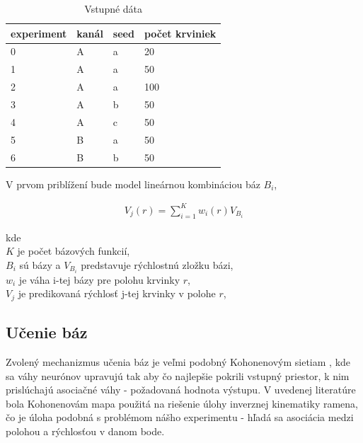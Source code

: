 \documentclass[10pt,a4paper]{article}
\begin{document}
\begin{table}[ht]
\centering
\caption{Vstupné dáta}
\label{tab:experiments}
\begin{tabular}{|l|l|l|l|}
\hline
experiment & kanál                    & {\color[HTML]{000000} seed} & {\color[HTML]{000000} počet krviniek} \\ \hline
0          & {\color[HTML]{FE0000} A} & {\color[HTML]{000000} a}    & {\color[HTML]{000000} 20}             \\ \hline
1          & {\color[HTML]{FE0000} A} & {\color[HTML]{000000} a}    & {\color[HTML]{000000} 50}             \\ \hline
2          & {\color[HTML]{FE0000} A} & {\color[HTML]{000000} a}    & {\color[HTML]{000000} 100}            \\ \hline
3          & {\color[HTML]{FE0000} A} & {\color[HTML]{000000} b}    & {\color[HTML]{000000} 50}             \\ \hline
4          & {\color[HTML]{FE0000} A} & {\color[HTML]{000000} c}    & {\color[HTML]{000000} 50}             \\ \hline
5          & {\color[HTML]{3531FF} B} & {\color[HTML]{000000} a}    & {\color[HTML]{000000} 50}             \\ \hline
6          & {\color[HTML]{3531FF} B} & {\color[HTML]{000000} b}    & {\color[HTML]{000000} 50}             \\ \hline
\end{tabular}
\end{table}

V prvom priblížení bude model lineárnou kombináciou báz $B_i$,

\begin{align}
 V_j(r) = \sum_{i=1}^{K} w_i(r)V_{B_i}
 \label{eq:lin_model}
\end{align}

kde \\
$K$ je počet bázových funkcií, \\
$B_i$ sú bázy a $V_{B_i}$ predstavuje rýchlostnú zložku bázi, \\
$w_i$ je váha i-tej bázy pre polohu krvinky $r$, \\
$V_j$ je predikovaná rýchlosť j-tej krvinky v polohe $r$, \\


\subsection{Učenie báz}

Zvolený mechanizmus učenia báz je veľmi podobný Kohonenovým sietiam \cite{bib:kohonen_network},
kde sa váhy neurónov upravujú tak aby čo najlepšie pokrili vstupný priestor, k nim
prislúchajú asociačné váhy - požadovaná hodnota výstupu. V uvedenej literatúre
bola Kohonenovám mapa použitá na riešenie úlohy inverznej kinematiky ramena, čo je úloha podobná s problémom nášho
experimentu - hľadá sa asociácia medzi polohou a rýchlosťou v danom bode.
\end{document}

